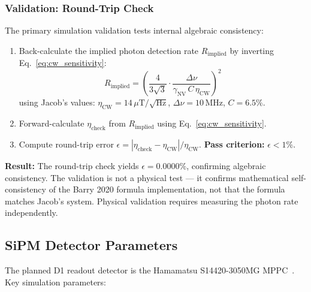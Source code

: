 \subsubsection{Validation: Round-Trip Check}

The primary simulation validation tests internal algebraic consistency:
\begin{enumerate}
  \item Back-calculate the implied photon detection rate $R_\mathrm{implied}$ by inverting
    Eq.~\eqref{eq:cw_sensitivity}:
    \begin{equation}
      R_\mathrm{implied} =
      \left(
        \frac{4}{3\sqrt{3}}
        \cdot \frac{\Delta\nu}{\gamma_\mathrm{NV}\, C\, \eta_\mathrm{CW}}
      \right)^2
      \label{eq:back_calc}
    \end{equation}
    using Jacob's values: $\eta_\mathrm{CW} = 14\,\mu\text{T}/\sqrt{\text{Hz}}$,
    $\Delta\nu = 10$\,MHz, $C = 6.5\%$.
  \item Forward-calculate $\eta_\mathrm{check}$ from $R_\mathrm{implied}$ using
    Eq.~\eqref{eq:cw_sensitivity}.
  \item Compute round-trip error $\epsilon = |\eta_\mathrm{check} - \eta_\mathrm{CW}|/\eta_\mathrm{CW}$.
    \textbf{Pass criterion:} $\epsilon < 1\%$.
\end{enumerate}

\textbf{Result:} The round-trip check yields $\epsilon = 0.0000\%$, confirming algebraic
consistency. The validation is not a physical test --- it confirms mathematical self-consistency
of the Barry 2020 formula implementation, not that the formula matches Jacob's system. Physical
validation requires measuring the photon rate independently.

\subsection{SiPM Detector Parameters}
\label{sec:sipm-params}

The planned D1 readout detector is the Hamamatsu S14420-3050MG MPPC~\cite{S14420datasheet}.
Key simulation parameters:

